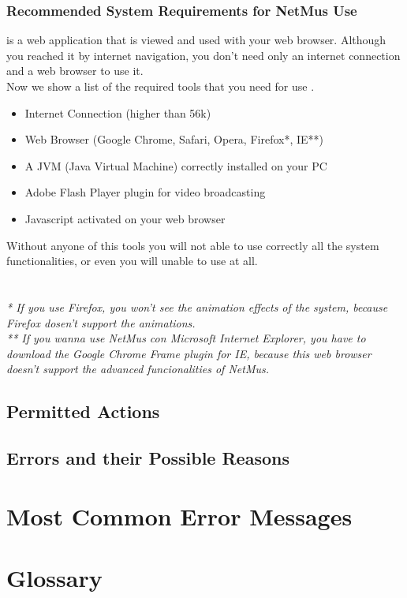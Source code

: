 \subsection{Recommended System Requirements for NetMus Use}
 is a web application that is viewed and used with your web browser.
Although you reached it by internet navigation, you don't need only an internet
connection and a web browser to use it.\\

Now we show a list of the required tools that you need for use .

\begin{itemize}
  \item Internet Connection (higher than 56k)
  \item Web Browser (Google Chrome, Safari, Opera, Firefox*, IE**)
  \item A JVM (Java Virtual Machine) correctly installed on your PC
  \item Adobe Flash Player plugin for video broadcasting
  \item Javascript activated on your web browser
\end{itemize}

Without anyone of this tools you will not able to use
correctly all the system functionalities, or even you will unable to use
 at all.\\
\\
\\

\emph{* If you use Firefox, you won't see the animation effects of the
system, because Firefox dosen't support the animations.}\\ 
\emph{** If you wanna use NetMus con Microsoft Internet Explorer, you have to
download the Google Chrome Frame plugin for IE, because this web browser doesn't
support the advanced funcionalities of NetMus.}\\




\section{Permitted Actions}

\section{Errors and their Possible Reasons}

\appendix %
\chapter{Most Common Error Messages}
\thispagestyle{fancy}

\chapter{Glossary}
\thispagestyle{fancy}

